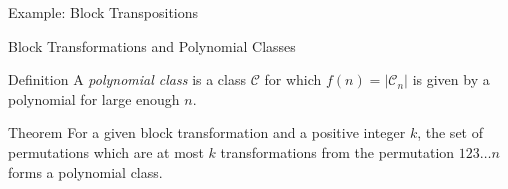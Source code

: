 \documentclass[xcolor=table,dvipsnames]{beamer}
\newcommand{\C}{\mathcal{C}}
\begin{document}
  \begin{frame}{Example: Block Transpositions}
  \end{frame}



  \begin{frame}{Block Transformations and Polynomial Classes} \pause
    
    \begin{block}{Definition}
      A \emph{polynomial class} is a class $\C$ for which $f(n) = |\C_n|$ is
      given by a polynomial for large enough $n$. 
    \end{block}

    \pause
      
    \begin{block}{Theorem}
      For a given block transformation and a positive integer $k$, the set of
      permutations which are at most $k$ transformations from the permutation $1
      2 3 \dots n$ forms a polynomial class.
    \end{block}
  \end{frame}
\end{document}
